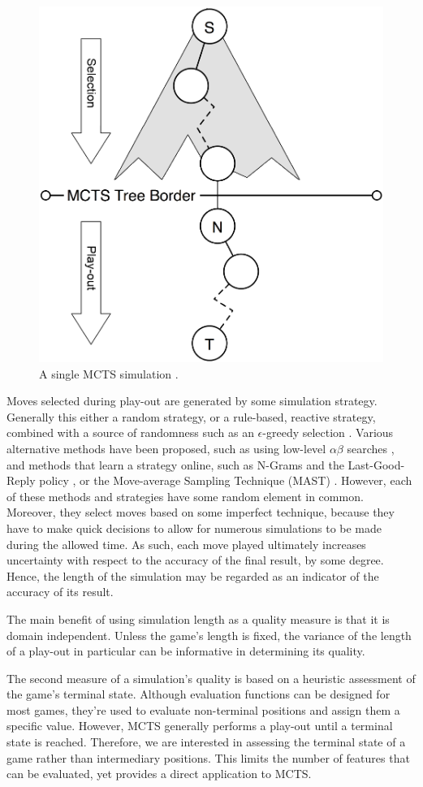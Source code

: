 \documentclass{ecai2010}
\begin{document}
\begin{figure}[t]
	\centering
	\includegraphics[width=.3\textwidth]{img/figure2.png}
	\caption{A single MCTS simulation \cite{finnsson2010learning}.}
	\label{fig:mcts-simulation}
\end{figure}

Moves selected during play-out are generated by some simulation strategy. Generally this either a random strategy, or a rule-based, reactive strategy, combined with a source of randomness such as an $\epsilon$-greedy selection \cite{sutton1998reinforcement, sturtevant2008analysis}. Various alternative methods have been proposed, such as using low-level $\alpha\beta$ searches \cite{winands2011a}, and methods that learn a strategy online, such as N-Grams and the Last-Good-Reply policy \cite{Tak2012}, or the Move-average Sampling Technique (MAST) \cite{finnsson2010learning}. However, each of these methods and strategies have some random element in common. Moreover, they select moves based on some imperfect technique, because they have to make quick decisions to allow for numerous simulations to be made during the allowed time. As such, each move played ultimately increases uncertainty with respect to the accuracy of the final result, by some degree. Hence, the length of the simulation may be regarded as an indicator of the accuracy of its result.

The main benefit of using simulation length as a quality measure is that it is domain independent. Unless the game's length is fixed, the variance of the length of a play-out in particular can be informative in determining its quality.

The second measure of a simulation's quality is based on a heuristic assessment of the game's terminal state. Although evaluation functions can be designed for most games, they're used to evaluate non-terminal positions and assign them a specific value. However, MCTS generally performs a play-out until a terminal state is reached. Therefore, we are interested in assessing the terminal state of a game rather than intermediary positions. This limits the number of features that can be evaluated, yet provides a direct application to MCTS.
\end{document}
